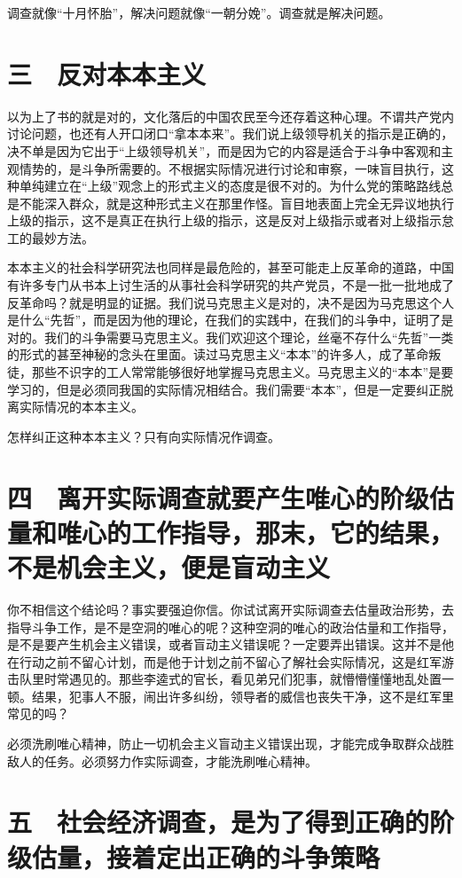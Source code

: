 调查就像“十月怀胎”，解决问题就像“一朝分娩”。调查就是解决问题。

\section{三　反对本本主义}

以为上了书的就是对的，文化落后的中国农民至今还存着这种心理。不谓共产党内讨论问题，也还有人开口闭口“拿本本来”。我们说上级领导机关的指示是正确的，决不单是因为它出于“上级领导机关”，而是因为它的内容是适合于斗争中客观和主观情势的，是斗争所需要的。不根据实际情况进行讨论和审察，一味盲目执行，这种单纯建立在“上级”观念上的形式主义的态度是很不对的。为什么党的策略路线总是不能深入群众，就是这种形式主义在那里作怪。盲目地表面上完全无异议地执行上级的指示，这不是真正在执行上级的指示，这是反对上级指示或者对上级指示怠工的最妙方法。

本本主义的社会科学研究法也同样是最危险的，甚至可能走上反革命的道路，中国有许多专门从书本上讨生活的从事社会科学研究的共产党员，不是一批一批地成了反革命吗？就是明显的证据。我们说马克思主义是对的，决不是因为马克思这个人是什么“先哲”，而是因为他的理论，在我们的实践中，在我们的斗争中，证明了是对的。我们的斗争需要马克思主义。我们欢迎这个理论，丝毫不存什么“先哲”一类的形式的甚至神秘的念头在里面。读过马克思主义“本本”的许多人，成了革命叛徒，那些不识字的工人常常能够很好地掌握马克思主义。马克思主义的“本本”是要学习的，但是必须同我国的实际情况相结合。我们需要“本本”，但是一定要纠正脱离实际情况的本本主义。

怎样纠正这种本本主义？只有向实际情况作调查。

\section{四　离开实际调查就要产生唯心的阶级估量和唯心的工作指导，那末，它的结果，不是机会主义，便是盲动主义}

你不相信这个结论吗？事实要强迫你信。你试试离开实际调查去估量政治形势，去指导斗争工作，是不是空洞的唯心的呢？这种空洞的唯心的政治估量和工作指导，是不是要产生机会主义错误，或者盲动主义错误呢？一定要弄出错误。这并不是他在行动之前不留心计划，而是他于计划之前不留心了解社会实际情况，这是红军游击队里时常遇见的。那些李逵式的官长，看见弟兄们犯事，就懵懵懂懂地乱处置一顿。结果，犯事人不服，闹出许多纠纷，领导者的威信也丧失干净，这不是红军里常见的吗？

必须洗刷唯心精神，防止一切机会主义盲动主义错误出现，才能完成争取群众战胜敌人的任务。必须努力作实际调查，才能洗刷唯心精神。

\section{五　社会经济调查，是为了得到正确的阶级估量，接着定出正确的斗争策略}

